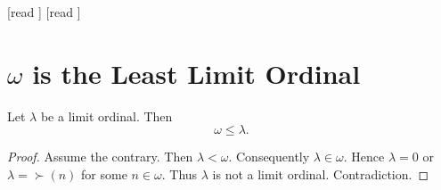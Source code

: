 \documentclass[10pt]{article}
\begin{document}
  \begin{imports}
    \begin{forthel}
      [read ]
      [read ]
    \end{forthel}
  \end{imports}


  \section*{$\omega$ is the Least Limit Ordinal}

  \begin{forthel}
    \begin{proposition}[id=SET_THEORY_03_5517271459954688,printid]
      Let $\lambda$ be a limit ordinal.
      Then \[ \omega \leq \lambda. \]
    \end{proposition}
    \begin{proof}
      Assume the contrary.
      Then $\lambda < \omega$.
      Consequently $\lambda \in \omega$.
      Hence $\lambda = 0$ or $\lambda = \succ(n)$ for some $n \in \omega$.
      Thus $\lambda$ is not a limit ordinal.
      Contradiction.
    \end{proof}
  \end{forthel}
\end{document}
